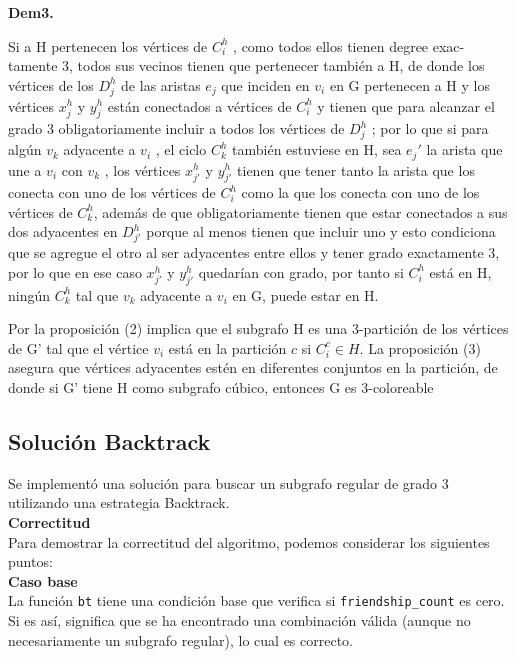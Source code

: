 \documentclass[
10pt, %
a4paper, %
oneside, %
headinclude,footinclude, %
BCOR5mm, %
]{scrartcl}
\begin{document}
\textbf{Dem3.}

Si a H pertenecen los vértices de $C^h_i$ , como todos ellos tienen degree exac-
tamente 3, todos sus vecinos tienen que pertenecer también a H, de donde los
vértices de los $D^h_j$ de las aristas $e_j$ que inciden en $v_i$ en G pertenecen a H y los
vértices $x^h_j$ y $y^h_j$ están conectados a vértices de $C^h_i$ y tienen que para alcanzar el
grado 3 obligatoriamente incluir a todos los vértices de $D^h_j$ ; por lo que si para
algún $v_k$ adyacente a $v_i$ , el ciclo $C^h_k$ también estuviese en H, sea $e_j'$ la arista
que une a $v_i$ con $v_k$ , los vértices $x_{j'}^{h}$ y $y_{j'}^{h}$ tienen que tener tanto la arista que los conecta
con uno de los vértices de $C^h_i$ como la que los conecta con uno de los vértices de $C^h_k$, además de que obligatoriamente tienen que estar 
conectados a sus dos adyacentes en $D_{j'}^{h}$ porque al menos tienen que incluir uno y esto condiciona que se agregue el otro al ser adyacentes 
entre ellos y tener grado exactamente 3, por lo que en ese caso $x_{j'}^{h}$ y $y_{j'}^{h}$ quedarían con grado, por tanto si $C^h_i$ está en H, ningún $C^h_k$ tal que $v_k$ adyacente a $v_i$ en G, puede estar en H.


Por la proposición (2) implica que el subgrafo H es una 3-partición de
los vértices de G' tal que el vértice $v_i$ está en la partición $c$ si $C^c_i \in H$. La
proposición (3) asegura que vértices adyacentes estén en diferentes conjuntos en
la partición, de donde si G' tiene H como subgrafo cúbico, entonces G es
3-coloreable



\subsection{Solución Backtrack}

Se implement\'o una solución para buscar un subgrafo regular de grado 3 utilizando una estrategia Backtrack.\\

\textbf{Correctitud}\\

Para demostrar la correctitud del algoritmo, podemos considerar los siguientes puntos: \\

\textbf{Caso base}\\

La función \texttt{bt} tiene una condición base que verifica si \texttt{friendship\_count} es cero. Si es así, significa que se ha encontrado una combinación válida (aunque no necesariamente un subgrafo regular), lo cual es correcto.\\
\end{document}
